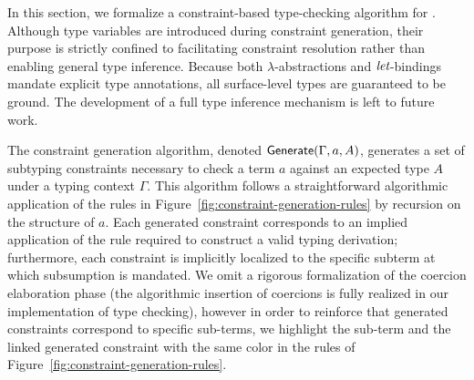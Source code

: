 \documentclass[runningheads]{llncs}
\begin{document}
In this section, we formalize a constraint-based type-checking algorithm for \lcataSub.
Although type variables are introduced during constraint generation, their purpose is strictly confined to facilitating constraint resolution rather than enabling general type inference.
Because both $\lambda$-abstractions and $\textit{let}$-bindings mandate explicit type annotations, all surface-level types are guaranteed to be ground.
The development of a full type inference mechanism is left to future work.

The constraint generation algorithm, denoted $\textsf{Generate}(\Gamma, a, A)$, generates a set of subtyping constraints necessary to check a term $a$ against an expected type $A$ under a typing context $\Gamma$.
This algorithm follows a straightforward algorithmic application of the rules in Figure~\ref{fig:constraint-generation-rules} by recursion on the structure of $a$.
Each generated constraint corresponds to an implied application of the  rule required to construct a valid typing derivation; furthermore, each constraint is implicitly localized to the specific subterm at which subsumption is mandated.
We omit a rigorous formalization of the coercion elaboration phase (the algorithmic insertion of coercions is fully realized in our implementation of type checking), however in order to reinforce that generated constraints correspond to specific sub-terms, we highlight the sub-term and the linked generated constraint with the same color in the rules of Figure~\ref{fig:constraint-generation-rules}.
\end{document}
